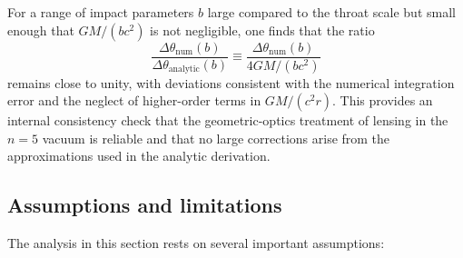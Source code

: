 \documentclass[11pt]{article}
\begin{document}
For a range of impact parameters $b$ large compared to the throat scale but
small enough that $GM/(b c^2)$ is not negligible, one finds that the ratio
\begin{equation}
  \frac{\Delta\theta_{\text{num}}(b)}
       {\Delta\theta_{\text{analytic}}(b)}
  \equiv
  \frac{\Delta\theta_{\text{num}}(b)}
       {4GM/(b c^2)}
\end{equation}
remains close to unity, with deviations consistent with the numerical
integration error and the neglect of higher-order terms in
$GM/(c^2 r)$.
This provides an internal consistency check that the geometric-optics
treatment of lensing in the $n=5$ vacuum is reliable and that no large
corrections arise from the approximations used in the analytic derivation.


\subsection{Assumptions and limitations}
\label{subsec:lensing-assumptions}

The analysis in this section rests on several important assumptions:
\end{document}
